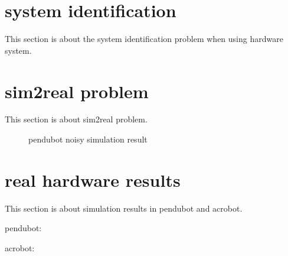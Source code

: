 \section{system identification}
This section is about the system identification problem when using hardware system.

\section{sim2real problem}
This section is about sim2real problem.

\begin{figure}[htbp]
    \centering
    \caption{pendubot noisy simulation result}
    \label{fig:image_b}
\end{figure}






\section{real hardware results}
This section is about simulation results in pendubot and acrobot.

pendubot:

acrobot:

\cleardoublepage
